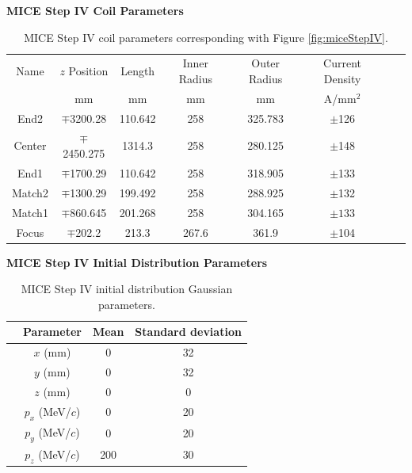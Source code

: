 \begin{table}
\caption*{\textbf{MICE Step IV Coil Parameters}}
\begin{tabularx}{\textwidth}{cccccccc}
\hline \hline
Name & $z$ Position & Length & Inner Radius & Outer Radius & Current Density  \vspace{-12pt}\\
 & mm & mm & mm & mm & A/mm$^2$  \\
\hline
	End2 & $\mp$3200.28&110.642&258&325.783&$\pm$126 \vspace{-12pt}\\
	Center&$\mp$2450.275&1314.3&258&280.125&$\pm$148 \vspace{-12pt}\\
	End1 & $\mp$1700.29& 110.642& 258 & 318.905 & $\pm$133 \vspace{-12pt}\\
	Match2 & $\mp$1300.29 & 199.492 & 258 & 288.925 & $\pm$132 \vspace{-12pt}\\
	Match1 & $\mp$860.645 & 201.268 & 258 & 304.165 & $\pm133$ \vspace{-12pt}\\
	Focus & $\mp$202.2 & 213.3 & 267.6 & 361.9 & $\pm$104 \\ 
\hline
\end{tabularx}
\caption[MICE Step IV coil parameters.]{MICE Step IV coil parameters corresponding with Figure \ref{fig:miceStepIV}.}
\label{tbl:MICE_coil_parameters}
\end{table}

\begin{table}
\caption*{\textbf{MICE Step IV Initial Distribution Parameters}}
\begin{center}
\begin{tabularx}{0.7\textwidth}{p{1cm}ccc}
\hline \hline
&Parameter & Mean & Standard deviation \\
\hline
	&$x$ (mm) & 0 & 32\vspace{-12pt}\\
	&$y$ (mm) & 0 & 32\vspace{-12pt} \\
	&$z$ (mm) & 0 & 0\vspace{-12pt} \\
	&$p_x$ (MeV/$c$) & 0 & 20\vspace{-12pt} \\
	&$p_y$ (MeV/$c$) & 0 & 20\vspace{-12pt} \\
	&$p_z$ (MeV/$c$) & 200 & 30\\
\hline
\end{tabularx}
\end{center}
\caption{MICE Step IV initial distribution Gaussian parameters.}
\label{tbl:MICE_initial_distribution_parameters}
\end{table}

